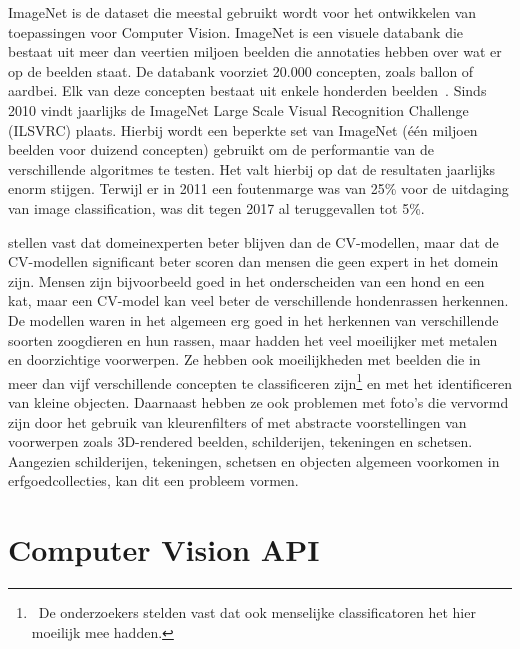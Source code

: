 ImageNet is de dataset die meestal gebruikt wordt voor het ontwikkelen van toepassingen voor Computer Vision. ImageNet is een visuele databank die bestaat uit meer dan veertien miljoen beelden die annotaties hebben over wat er op de beelden staat. De databank voorziet 20.000 concepten, zoals ballon of aardbei. Elk van deze concepten bestaat uit enkele honderden beelden~\autocites{WikiImageNet}{Brownlee2019a}. Sinds 2010 vindt jaarlijks de ImageNet Large Scale Visual Recognition Challenge (ILSVRC) plaats. Hierbij wordt een beperkte set van ImageNet (één miljoen beelden voor duizend concepten) gebruikt om de performantie van de verschillende algoritmes te testen. Het valt hierbij op dat de resultaten jaarlijks enorm stijgen. Terwijl er in 2011 een foutenmarge was van 25\% voor de uitdaging van image classification, was dit tegen 2017 al teruggevallen tot 5\%. 

\textcite{Russakovsky2014} stellen vast dat domeinexperten beter blijven dan de CV-modellen, maar dat de CV-modellen significant beter scoren dan mensen die geen expert in het domein zijn. Mensen zijn bijvoorbeeld goed in het onderscheiden van een hond en een kat, maar een CV-model kan veel beter de verschillende hondenrassen herkennen. De modellen waren in het algemeen erg goed in het herkennen van verschillende soorten zoogdieren en hun rassen, maar hadden het veel moeilijker met metalen en doorzichtige voorwerpen. Ze hebben ook moeilijkheden met beelden die in meer dan vijf verschillende concepten te classificeren zijn\footnote{~De onderzoekers stelden vast dat ook menselijke classificatoren het hier moeilijk mee hadden.} en met het identificeren van kleine  objecten. Daarnaast hebben ze ook problemen met foto’s die vervormd zijn door het gebruik van kleurenfilters  of met abstracte voorstellingen van voorwerpen zoals 3D-rendered beelden, schilderijen, tekeningen en schetsen. Aangezien schilderijen, tekeningen, schetsen en objecten algemeen voorkomen in erfgoedcollecties, kan dit een probleem vormen.

\section{Computer Vision API}
\label{sec:CV-API}


